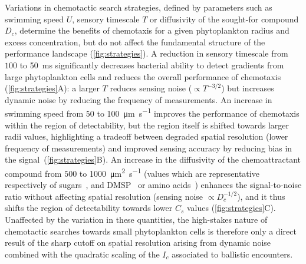 \documentclass[9pt,twocolumn,twoside]{pnas-new}
\begin{document}
Variations in chemotactic search strategies, defined by parameters such as swimming speed $U$, sensory timescale $T$ or diffusivity of the sought-for compound $D_c$, determine the benefits of chemotaxis for a given phytoplankton radius and excess concentration, but do not affect the fundamental structure of the performance landscape (\autoref{fig:strategies}).
A reduction in sensory timescale from $100$ to \SI{50}{\milli\s} significantly decreases bacterial ability to detect gradients from large phytoplankton cells and reduces the overall performance of chemotaxis (\autoref{fig:strategies}A): a larger $T$ reduces sensing noise ($\propto T^{-3/2}$) but increases dynamic noise by reducing the frequency of measurements.
An increase in swimming speed from $50$ to \SI{100}{\micro\m\per\s} improves the performance of chemotaxis within the region of detectability, but the region itself is shifted towards larger radii values, highlighting a tradeoff between degraded spatial resolution (lower frequency of measurements) and improved sensing accuracy by reducing bias in the signal~\cite{hein2016physical}(\autoref{fig:strategies}B).
An increase in the diffusivity of the chemoattractant compound from $500$ to \SI{1000}{\micro\m^2\per\s} 
(values which are representative respectively of sugars~\cite{schramke1999prediction}, and DMSP~\cite{spiese2018determination} or amino acids~\cite{ma2005studies})
enhances the signal-to-noise ratio without affecting spatial resolution (sensing noise $\propto D_c^{-1/2}$), and it thus shifts the region of detectability towards lower $C_s$ values (\autoref{fig:strategies}C).
Unaffected by the variation in these quantities, the high-stakes nature of chemotactic searches towards small phytoplankton cells is therefore only a direct result of the sharp cutoff on spatial resolution arising from dynamic noise combined with the quadratic scaling of the $I_c$ associated to ballistic encounters.
\end{document}
